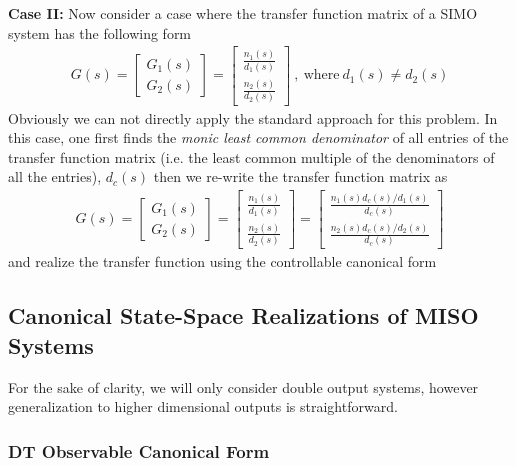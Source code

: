\documentclass[twoside]{article}
\begin{document}
\textbf{Case II:} Now consider a case where the transfer function matrix of a SIMO system has the following form
%
\begin{align*}
	G(s) = \left[ \begin{array}{c} G_1(s) \\ G_2(s) \end{array} \right] = \left[ \begin{array}{c} \frac{n_1(s)}{d_1(s)} \\ \frac{n_2(s)}{d_2(s)} \end{array} \right]	      
	\ , \ \mathrm{where} \ d_1(s) \neq d_2(s)
\end{align*}
% 
Obviously we can not directly apply the standard approach for this problem. In this case, one first finds
the \textit{monic least common denominator} of all entries of the transfer function matrix (i.e. the least common multiple of the
denominators of all the entries), $d_c(s)$ then we re-write the transfer function matrix as
%
\begin{align*}
	G(s) = \left[ \begin{array}{c} G_1(s) \\ G_2(s) \end{array} \right] = \left[ \begin{array}{c} \frac{n_1(s)}{d_1(s)} \\ \frac{n_2(s)}{d_2(s)} \end{array} \right]	      
	= \left[ \begin{array}{c} \frac{n_1(s) d_c(s) / d_1(s) }{d_c(s)} \\ \frac{n_2(s) d_c(s) / d_2(s)}{d_c(s)} \end{array} \right]	      
\end{align*}
% 
and realize the transfer function using the controllable canonical form
 
\subsection{Canonical State-Space Realizations of MISO Systems}

For the sake of clarity, we will only consider double output systems, however generalization to higher dimensional outputs is straightforward. 

\subsubsection{DT Observable Canonical Form}
\end{document}
